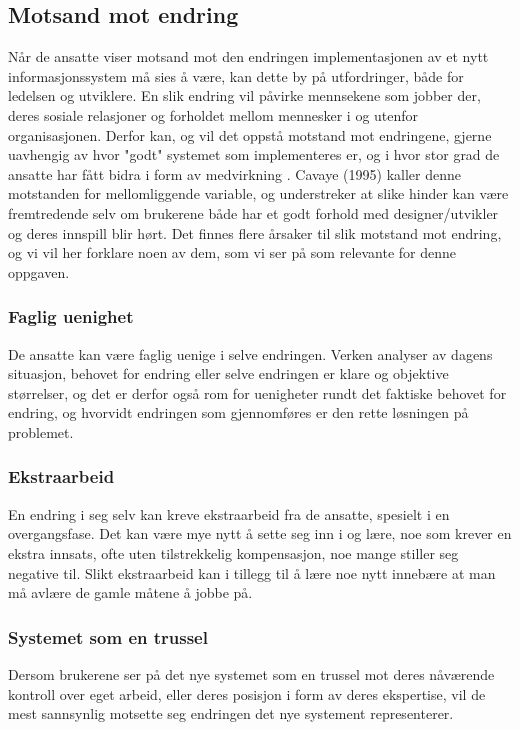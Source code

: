 \subsection{Motsand mot endring}
\label{chp: Motstand}

Når de ansatte viser motsand mot den endringen implementasjonen av et nytt informasjonssystem må sies å være, kan dette by på utfordringer, både for ledelsen og utviklere. En slik endring vil påvirke mennsekene som jobber der, deres sosiale relasjoner og forholdet mellom mennesker i og utenfor organisasjonen. Derfor kan, og vil det oppstå motstand mot endringene, gjerne uavhengig av hvor "godt" systemet som implementeres er, og i hvor stor grad de ansatte har fått bidra i form av medvirkning \cite{Jacobsen12}. Cavaye (1995) kaller denne motstanden for mellomliggende variable, og understreker at slike hinder kan være fremtredende selv om brukerene både har et godt forhold med designer/utvikler og deres innspill blir hørt. Det finnes flere årsaker til slik motstand mot endring, og vi vil her forklare noen av dem, som vi ser på som relevante for denne oppgaven. 

\subsubsection{Faglig uenighet}
De ansatte kan være faglig uenige i selve endringen. Verken analyser av dagens situasjon, behovet for endring eller selve endringen er klare og objektive størrelser, og det er derfor også rom for uenigheter rundt det faktiske behovet for endring, og hvorvidt endringen som gjennomføres er den rette løsningen på problemet. \cite{Jacobsen12}

\subsubsection{Ekstraarbeid}
En endring i seg selv kan kreve ekstraarbeid fra de ansatte, spesielt i en overgangsfase. Det kan være mye nytt å sette seg inn i og lære, noe som krever en ekstra innsats, ofte uten tilstrekkelig kompensasjon, noe mange stiller seg negative til. Slikt ekstraarbeid kan i tillegg til å lære noe nytt innebære at man må avlære de gamle måtene å jobbe på. \cite{Jacobsen12}

\subsubsection{Systemet som en trussel}
Dersom brukerene ser på det nye systemet som en trussel mot deres nåværende kontroll over eget arbeid, eller deres posisjon i form av deres ekspertise, vil de mest sannsynlig motsette seg endringen det nye systement representerer. \cite{Cavaye95}

